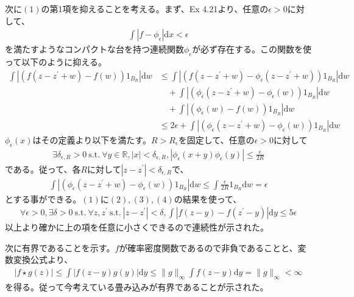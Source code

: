 \documentclass{article}
\begin{document}
次に$(1)$の第1項を抑えることを考える。まず、Ex 4.21より、任意の$\epsilon > 0$に対して、
\begin{align*}
	\int \left| f- \phi_{\epsilon} \right| \mathrm{d}x < \epsilon
\end{align*}
を満たすようなコンパクトな台を持つ連続関数$\phi_{\epsilon}$が必ず存在する。この関数を使って以下のように抑える。
\begin{align}
	\int \left| \left( f(z-z^{\prime}+w) - f(w)\right) 1_{B_R} \right| \mathrm{d}w &\leq \int \left| \left( f(z-z^{\prime} +w) - \phi_{\epsilon}(z-z^{\prime} +w) \right)1_{B_R} \right| \mathrm{d}w \nonumber \\&\quad +  \int \left| \left( \phi_{\epsilon}(z-z^{\prime} +w) - \phi_{\epsilon}(w) \right)1_{B_R} \right| \mathrm{d}w \nonumber \\ &\quad +  \int \left| \left( \phi_{\epsilon}(w) - f(w) \right)1_{B_R} \right| \mathrm{d}w \nonumber \\[8pt]
	&\leq 2\epsilon + \int \left| \left( \phi_{\epsilon}(z-z^{\prime} +w) - \phi_{\epsilon}(w) \right)1_{B_R} \right| \mathrm{d}w
\end{align}
$\phi_{\epsilon}(x)$はその定義より以下を満たす。$R > R_{\epsilon}$を固定して、任意の$\epsilon > 0$に対して
\begin{align*}
	\exists \delta_{\epsilon, R} > 0\ \text{s.t.}\ \forall y \in \mathbb{R}, \left| x \right| < \delta_{\epsilon, R}, \left| \phi_{\epsilon}(x + y) \phi_{\epsilon}(y) \right| \leq \frac{\epsilon}{2R}
\end{align*}
である。従って、各$R$に対して$\left| z-z^{\prime} \right| < \delta_{\epsilon, R}$で、
\begin{align}
	\int \left| \left( \phi_{\epsilon}(z-z^{\prime} +w) - \phi_{\epsilon}(w) \right)1_{B_R} \right| \mathrm{d}w \leq \int \frac{\epsilon}{2R} 1_{B_R}\mathrm{d}w = \epsilon
\end{align}
とする事ができる。$(1)$に$(2),(3),(4)$の結果を使って、
\begin{align*}
	\forall \epsilon > 0, \exists \delta > 0\ \text{s.t.}\ \forall z,z^{\prime}\ \text{s.t.}\ \left| z-z^{\prime} \right| < \delta, \int \left| f(z-y) - f(z^{\prime} -y) \right| \mathrm{d}y \leq 5\epsilon
\end{align*}
以上より確かに上の項を任意に小さくできるので連続性が示された。

次に有界であることを示す。$f$が確率密度関数であるので非負であることと、変数変換公式より、
\begin{align*}
	\left| f\star g(z) \right| \leq \int \left| f(z-y) g(y) \right| \mathrm{d}y \leq \| g \|_{\infty} \int f(z-y) \mathrm{d}y = \| g \|_{\infty} < \infty
\end{align*}
を得る。従って今考えている畳み込みが有界であることが示された。
\end{document}
